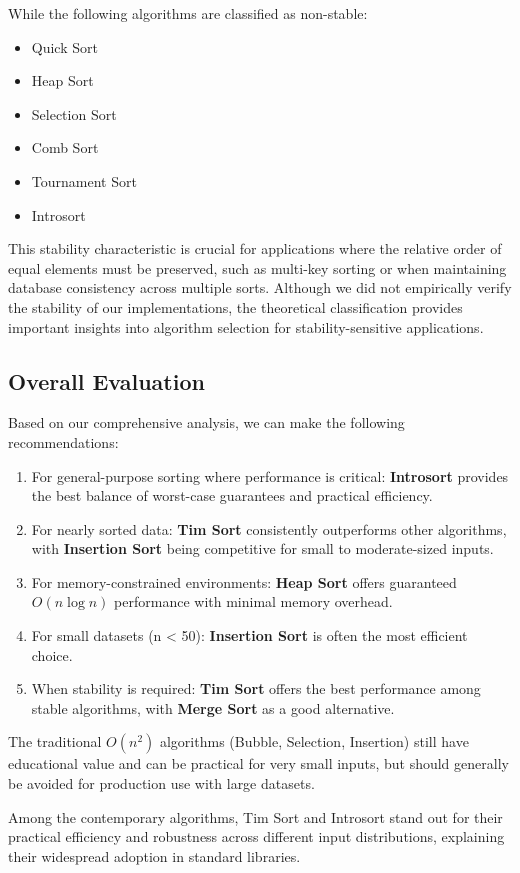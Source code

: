 \documentclass[sigconf]{acmart}
\begin{document}
While the following algorithms are classified as non-stable:
\begin{itemize}
    \item Quick Sort
    \item Heap Sort
    \item Selection Sort
    \item Comb Sort
    \item Tournament Sort
    \item Introsort
\end{itemize}

This stability characteristic is crucial for applications where the relative order of equal elements must be preserved, such as multi-key sorting or when maintaining database consistency across multiple sorts. Although we did not empirically verify the stability of our implementations, the theoretical classification provides important insights into algorithm selection for stability-sensitive applications.

\subsection{Overall Evaluation}
Based on our comprehensive analysis, we can make the following recommendations:

\begin{enumerate}
    \item For general-purpose sorting where performance is critical: \textbf{Introsort} provides the best balance of worst-case guarantees and practical efficiency.
    
    \item For nearly sorted data: \textbf{Tim Sort} consistently outperforms other algorithms, with \textbf{Insertion Sort} being competitive for small to moderate-sized inputs.
    
    \item For memory-constrained environments: \textbf{Heap Sort} offers guaranteed $O(n \log n)$ performance with minimal memory overhead.
    
    \item For small datasets (n < 50): \textbf{Insertion Sort} is often the most efficient choice.
    
    \item When stability is required: \textbf{Tim Sort} offers the best performance among stable algorithms, with \textbf{Merge Sort} as a good alternative.
\end{enumerate}

The traditional $O(n^2)$ algorithms (Bubble, Selection, Insertion) still have educational value and can be practical for very small inputs, but should generally be avoided for production use with large datasets.

Among the contemporary algorithms, Tim Sort and Introsort stand out for their practical efficiency and robustness across different input distributions, explaining their widespread adoption in standard libraries.

\nocite{*}



\end{document}
